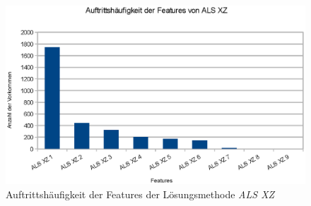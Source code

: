 \begin{figure}[H]
    \includegraphics[width=\textwidth,height=\textheight,keepaspectratio]{./img/alsxz_anzahl.eps}
    \caption{Auftrittshäufigkeit der Features der Lösungsmethode \textit{ALS XZ}}
\end{figure}

